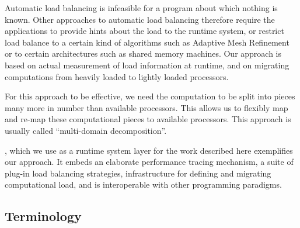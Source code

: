 \documentclass[10pt]{article}
\begin{document}
Automatic load balancing is infeasible for a program about which nothing is
known. Other approaches to automatic load balancing therefore require the
applications to provide hints about the load to the runtime system, or restrict
load balance to a certain kind of algorithms such as Adaptive Mesh Refinement
or  to certain architectures such as shared memory machines. Our approach is
based on actual measurement of load information at runtime, and on migrating
computations from heavily loaded to lightly loaded processors.

For this approach to be effective, we need the computation to be split into
pieces many more in number than available processors. This allows us to
flexibly map and re-map these computational pieces to available processors.
This approach is usually called ``multi-domain decomposition''.

\charmpp{}, which we use as a runtime system layer for the work described here
exemplifies our approach. It embeds an elaborate performance tracing mechanism,
a suite of plug-in load balancing strategies, infrastructure for defining and
migrating computational load, and is interoperable with other programming
paradigms.

\subsection{Terminology}
\end{document}
